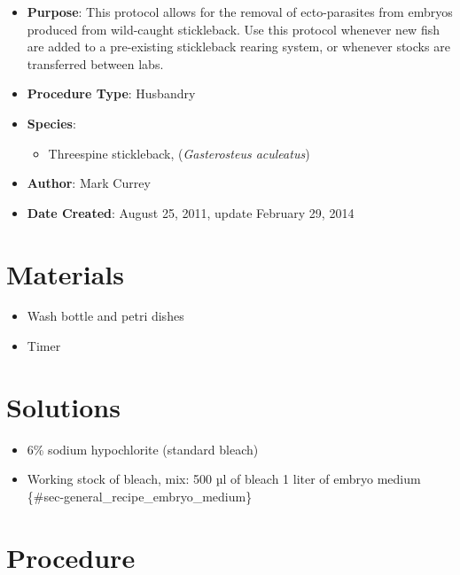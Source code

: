 \documentclass[
  letterpaper,
  DIV=11,
  numbers=noendperiod]{scrreprt}
\providecommand{\tightlist}{%
  \setlength{\itemsep}{0pt}\setlength{\parskip}{0pt}}\usepackage{longtable,booktabs,array}
\begin{document}
\begin{itemize}
\tightlist
\item
  \textbf{Purpose}: This protocol allows for the removal of
  ecto-parasites from embryos produced from wild-caught stickleback. Use
  this protocol whenever new fish are added to a pre-existing
  stickleback rearing system, or whenever stocks are transferred between
  labs.
\item
  \textbf{Procedure Type}: Husbandry
\item
  \textbf{Species}:

  \begin{itemize}
  \tightlist
  \item
    Threespine stickleback, (\emph{Gasterosteus aculeatus})
  \end{itemize}
\item
  \textbf{Author}: Mark Currey\\
\item
  \textbf{Date Created}: August 25, 2011, update February 29, 2014
\end{itemize}

\hypertarget{materials-52}{%
\section{Materials}\label{materials-52}}

\begin{itemize}
\tightlist
\item
  Wash bottle and petri dishes
\item
  Timer
\end{itemize}

\hypertarget{solutions-43}{%
\section{Solutions}\label{solutions-43}}

\begin{itemize}
\tightlist
\item
  6\% sodium hypochlorite (standard bleach)
\item
  Working stock of bleach, mix: 500 µl of bleach 1 liter of embryo
  medium \{\#sec-general\_recipe\_embryo\_medium\}
\end{itemize}

\hypertarget{procedure-52}{%
\section{Procedure}\label{procedure-52}}
\end{document}
